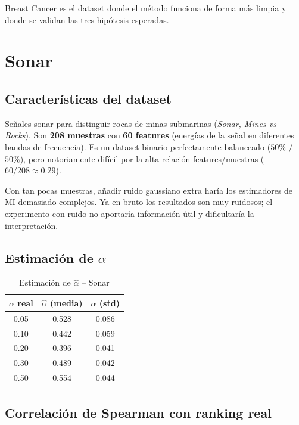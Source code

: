 \documentclass[a4paper,11pt]{article}
\begin{document}
Breast Cancer es el dataset donde el método funciona de forma más limpia y donde se validan las tres hipótesis esperadas.

\section{Sonar}

\subsection{Características del dataset}

Señales sonar para distinguir rocas de minas submarinas (\textit{Sonar, Mines vs Rocks}). Son \textbf{208 muestras} con \textbf{60 features} (energías de la señal en diferentes bandas de frecuencia). Es un dataset binario perfectamente balanceado ($50\%$ / $50\%$), pero notoriamente difícil por la alta relación features/muestras ($60/208 \approx 0.29$).

Con tan pocas muestras, añadir ruido gaussiano extra haría los estimadores de MI demasiado complejos. Ya en bruto los resultados son muy ruidosos; el experimento con ruido no aportaría información útil y dificultaría la interpretación.

\subsection{Estimación de $\alpha$}

\begin{table}[H]
\centering
\caption{Estimación de $\hat{\alpha}$ -- Sonar}
\begin{tabular}{ccc}
\toprule
$\alpha$ real & $\hat{\alpha}$ (media) & $\hat{\alpha}$ (std) \\
\midrule
0.05 & 0.528 & 0.086 \\
0.10 & 0.442 & 0.059 \\
0.20 & 0.396 & 0.041 \\
0.30 & 0.489 & 0.042 \\
0.50 & 0.554 & 0.044 \\
\bottomrule
\end{tabular}
\end{table}

\subsection{Correlación de Spearman con ranking real}
\end{document}
